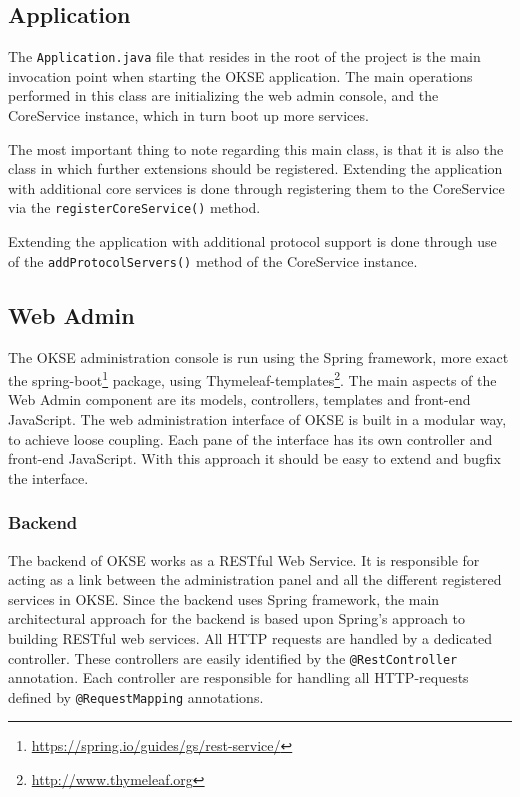 \subsection{Application}

The \verb!Application.java! file that resides in the root of the project is the main invocation point when starting the OKSE application. The main operations performed in this class are initializing the web admin console, and the CoreService instance, which in turn boot up more services.

The most important thing to note regarding this main class, is that it is also the class in which further extensions should be registered. Extending the application with additional core services is done through registering them to the CoreService via the \verb!registerCoreService()! method.

Extending the application with additional protocol support is done through use of the \verb!addProtocolServers()! method of the CoreService instance.

\subsection{Web Admin}

The OKSE administration console is run using the Spring framework, more exact the spring-boot\footnote{\url{https://spring.io/guides/gs/rest-service/}} package, using Thymeleaf-templates\footnote{\url{http://www.thymeleaf.org}}. The main aspects of the Web Admin component are its models, controllers, templates and front-end JavaScript. The web administration interface of OKSE is built in a modular way, to achieve loose coupling. Each pane of the interface has its own controller and front-end JavaScript.  With this approach it should be easy to extend and bugfix the interface.

\subsubsection{Backend}

The backend of OKSE works as a RESTful Web Service. It is responsible for acting as a link between the administration panel and all the different registered services in OKSE. Since the backend uses Spring framework, the main architectural approach for the backend is based upon Spring’s approach to building RESTful web services. All HTTP requests are handled by a dedicated controller. These controllers are easily identified by the \verb!@RestController! annotation. Each controller are responsible for handling all HTTP-requests defined by \verb!@RequestMapping! annotations.  

